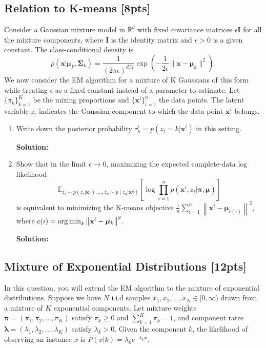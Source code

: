 \documentclass[11pt,epic]{article}
\def\argmin{\operatornamewithlimits{arg\, min}}
\newenvironment{solution}
  {\par\medskip
  \color{gray}%
   \begin{framed}
   \textbf{Solution: \newline}\ignorespaces}
 {\end{framed}
  \medskip}
\begin{document}
\subsection{Relation to K-means [8pts]}
Consider a Gaussian mixture model in $\mathbb{R}^d$ with fixed covariance matrices $\epsilon \mathbf{I}$ for all the mixture components, where $\mathbf{I}$ is the identity matrix and $\epsilon > 0$ is a given constant. The class-conditional density is  
\begin{equation*}
    p(\mathbf{x}|\boldsymbol{\mu}_k, \boldsymbol{\Sigma}_k)=
    \frac{1}{(2\pi\epsilon)^{d/2}}\exp\left({-\frac{1}{2\epsilon}\|\mathbf{x}-\boldsymbol{\mu}_k\|^2}\right).
\end{equation*}
We now consider the EM algorithm for a mixture of K Gaussians of this form while treating $\epsilon$ as a fixed constant instead of a parameter to estimate. Let $\{\pi_k\}_{k=1}^K$ be the mixing proportions and $\{\mathbf{x}^i\}_{i=1}^n$ the data points. The latent variable $z_i$ indicates the Gaussian component to which the data point $\mathbf{x}^i$ belongs.
\begin{enumerate}[label=(\alph*)]
    \item Write down the posterior probability $\tau_k^i=p(z_i=k|\mathbf{x}^i)$ in this setting.
    \begin{solution}
        
    \end{solution}


    \item Show that in the limit $\epsilon \rightarrow 0$, maximizing the expected complete-data log likelihood \begin{equation*}
        \mathbb{E}_{z_1\sim p(z_1|\mathbf{x}^1), ...,z_n\sim p(z_n|\mathbf{x}^n)}\left[\log{\prod_{i=1}^n p(\mathbf{x}^i, z_i|\boldsymbol{\pi}, \boldsymbol{\mu})}\right]
    \end{equation*} is equivalent to minimizing the K-means objective $\frac{1}{n}\sum_{i=1}^n\left\|\mathbf{x}^i-\boldsymbol{\mu}_{c(i)}\right\|^2$, where $c(i)=\argmin_k \left\|\mathbf{x}^i-\boldsymbol{\mu}_k\right\|^2$.
    \begin{solution}
        
    \end{solution}
    \end{enumerate}

\subsection{Mixture of Exponential Distributions [12pts]}
In this question, you will extend the EM algorithm to the mixture of exponential distributions. Suppose we have $N$ i.i.d samples $x_1, x_2, ..., x_N\in[0, \infty)$ drawn from a mixture of $K$ exponential components. Let mixture weights $\boldsymbol{\pi}=\left(\pi_1, \pi_2, ..., \pi_K\right)$ satisfy $\pi_k \geq 0$ and $\sum_{k=1}^K\pi_k=1$, and component rates $\boldsymbol{\lambda}=\left(\lambda_1, \lambda_2, ..., \lambda_K\right)$ satisfy $\lambda_k>0$. Given the component $k$, the likelihood of observing an instance $x$ is $P(x|k)=\lambda_ke^{-\lambda_kx}$.
\end{document}
